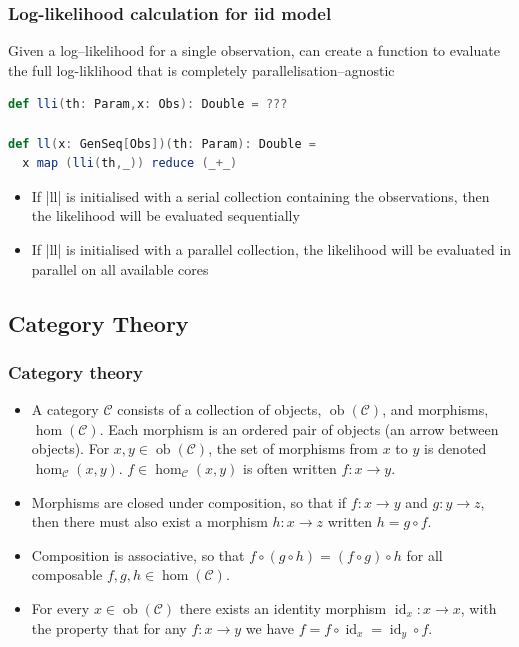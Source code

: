 \documentclass[mathserif,handout]{beamer}
\begin{document}
\begin{frame}[fragile]
  \frametitle{Log-likelihood calculation for iid model}
Given a log--likelihood for a single observation, can create a function to evaluate the full log-liklihood that is completely \alert{parallelisation--agnostic}
\begin{lstlisting}[language=scala]
def lli(th: Param,x: Obs): Double = ???

def ll(x: GenSeq[Obs])(th: Param): Double =
  x map (lli(th,_)) reduce (_+_)
\end{lstlisting}
\begin{itemize}
\item If |ll| is initialised with a serial collection containing the observations, then the likelihood will be evaluated sequentially
\item If |ll| is initialised with a parallel collection, the likelihood will be evaluated in parallel on all available cores
\end{itemize}
\end{frame}



\subsection{Category Theory}

\begin{frame}[fragile]
  \frametitle{Category theory}
  \begin{itemize}
  \item A category $\mathcal{C}$ consists of a collection of \alert{objects}, $\operatorname{ob}(\mathcal{C})$, and \alert{morphisms}, $\operatorname{hom}(\mathcal{C})$. Each morphism is an ordered pair of objects (an arrow between objects). For $x,y\in \operatorname{ob}(\mathcal{C})$, the set of morphisms from $x$ to $y$ is denoted $\operatorname{hom}_{\mathcal{C}}(x,y)$. $f\in \operatorname{hom}_{\mathcal{C}}(x,y)$ is often written $f: x \longrightarrow y$.
  \item Morphisms are closed under \alert{composition}, so that if $f: x\longrightarrow y$ and $g: y\longrightarrow z$, then there must also exist a morphism $h: x\longrightarrow z$ written $h=g \circ f$.
  \item Composition is associative, so that $f\circ(g\circ h) = (f\circ g)\circ h$ for all composable $f, g, h\in \operatorname{hom}(\mathcal{C})$.
    \item For every $x\in \operatorname{ob}(\mathcal{C})$ there exists an \alert{identity} morphism $\operatorname{id}_x: x\longrightarrow x$, with the property that for any $f: x\longrightarrow y$ we have $f = f\circ \operatorname{id}_x = \operatorname{id}_y\circ f$.
  \end{itemize}
\end{frame}
\end{document}

